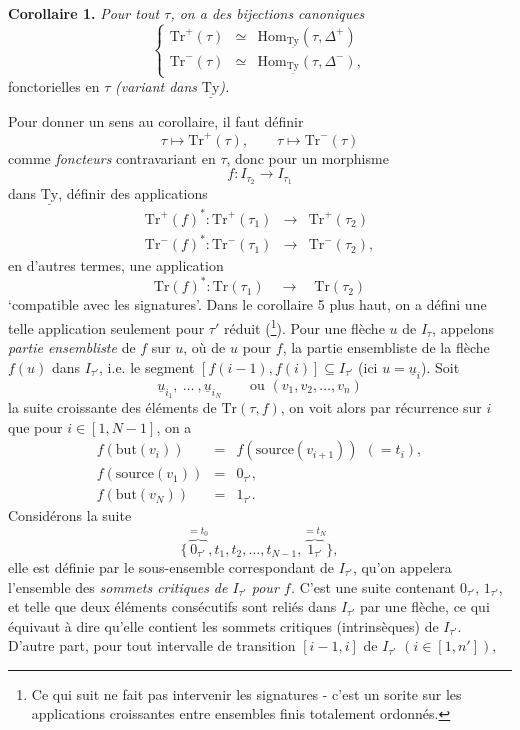 \documentclass[11pt]{article}
\newcommand{\printedpage}[1]{\marginpar{\footnotesize p.~#1}}
\newcommand{\msp}[1]{\marginpar{\footnotesize [#1]}}
\newcommand{\Tr}{\mathrm{Tr}}
\newcommand{\Hom}{\mathrm{Hom}}
\newcommand{\uTy}{\underline{\mathrm{Ty}}}
\begin{document}
\textbf{Corollaire 1.} \textit{Pour tout $\tau$, on a des bijections canoniques}
\[
\left\{
\begin{array}{lcl}
\Tr^+(\tau) & \simeq & \Hom_{\uTy}(\tau, \Delta^+) \\
\Tr^-(\tau) & \simeq & \Hom_{\uTy}(\tau, \Delta^-),
\end{array}
\right.
\]
fonctorielles en $\tau$ \textit{(variant dans} $\uTy$\textit{).}

\printedpage{26}

Pour donner un sens au corollaire, il faut définir
\[
\tau \longmapsto \Tr^+(\tau), \qquad \tau \longmapsto \Tr^-(\tau)
\]
comme \textit{foncteurs} contravariant en $\tau$, donc pour un morphisme
\[
f : I_{\tau_2} \longrightarrow I_{\tau_1}
\]
dans $\uTy$, définir des applications
\msp{page 41}
\[
\begin{array}{rcl}
\Tr^+(f)^* : \Tr^+(\tau_1) & \longrightarrow & \Tr^+(\tau_2) \\
\Tr^-(f)^* : \Tr^-(\tau_1) & \longrightarrow & \Tr^-(\tau_2),
\end{array}
\]
en d'autres termes, une application
\[
\Tr(f)^* : \Tr(\tau_1) \quad \longrightarrow \quad \Tr(\tau_2)
\]
‘compatible avec les signatures’. Dans le corollaire 5 plus haut, on a défini une telle application seulement pour $\tau'$ réduit (\footnote[12]{Ce qui suit ne fait pas intervenir les signatures - c'est un sorite sur les applications croissantes entre ensembles finis totalement ordonnés.}). Pour une flèche $u$ de $I_\tau$, appelons \textit{partie ensembliste} de $f$ sur $u$, où de $u$ pour $f$, la partie ensembliste de la flèche $f(u)$ dans $I_{\tau'}$, i.e. le segment $[f(i-1), f(i)] \subseteq I_{\tau'}$ (ici $u = \underline{u}_i$). Soit %
\[
\underline{u}_{i_1},\ \dots\ ,\underline{u}_{i_N} \qquad \text{ou } (v_1, v_2, \dots, v_n)
\] %
la suite croissante des éléments de $\Tr(\tau, f)$, on voit alors par récurrence sur $i$ que pour $i \in [1, N-1]$, on a
\[
\begin{array}{rcl}
f(\mathrm{but}(v_i)) & = & f(\mathrm{source}(v_{i+1}))\ \ (= t_i), \\
f(\mathrm{source}(v_1)) & = & 0_{\tau'}, \\
f(\mathrm{but}(v_N)) & = & 1_{\tau'}.
\end{array}
\]
Considérons la suite
\[
\{\overbrace{0_{\tau'}}^{= t_0}, t_1, t_2, \dots, t_{N-1}, \overbrace{1_{\tau'}}^{= t_N}\},
\]
elle est définie par le sous-ensemble correspondant de $I_{\tau'}$, qu'on appelera l'ensemble des \textit{sommets critiques de $I_{\tau'}$ pour $f$.} C'est une suite contenant $0_{\tau'}$, $1_{\tau'}$, et telle que deux éléments consécutifs sont reliés dans $I_{\tau'}$ par une flèche, ce qui équivaut à dire qu'elle contient les sommets critiques (intrinsèques) de $I_{\tau'}$. D'autre part, pour tout intervalle de transition $[i-1, i]$ de $I_{\tau'}$ $(i \in [1, n'])$, %
\end{document}
